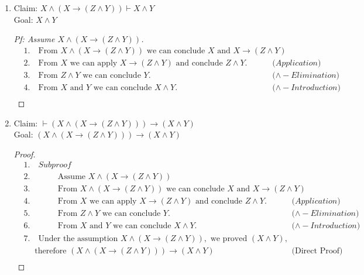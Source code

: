 \documentclass{article}
\begin{document}
\begin{enumerate}
\begin{enumerate}
        \item
        Claim: $X \land (X \rightarrow (Z \land Y)) \vdash X \land Y$ \\
        Goal: $X \land Y$
        \begin{proof}[Pf: Assume $X \land (X \rightarrow (Z \land Y))$]
            \begin{align*}
                &1. \quad \text{From } X \land (X \rightarrow (Z \land Y)) \text{ we can conclude } X \text{ and } X \rightarrow (Z \land Y) \\
                &2. \quad \text{From } X \text{ we can apply } X \rightarrow (Z \land Y) \text{ and conclude } Z \land Y. && \text{($Application$)} \\
                &3. \quad \text{From } Z \land Y \text{ we can conclude } Y. && \text{($\land - Elimination$)} \\
                &4. \quad \text{From } X \text{ and } Y \text{ we can conclude } X \land Y. && \text{($\land - Introduction$)} \\
            \end{align*}
        \end{proof}

        \item
        Claim: $\vdash (X \land (X \rightarrow (Z \land Y))) \rightarrow (X \land Y)$ \\
        Goal: $(X \land (X \rightarrow (Z \land Y))) \rightarrow (X \land Y)$
        \begin{proof}[Proof]
            \begin{align*}
                &1. \quad Subproof \\
                &2. \quad \hspace{1cm} \text{Assume } X \land (X \rightarrow (Z \land Y)) \\
                &3. \quad \hspace{1cm} \text{From } X \land (X \rightarrow (Z \land Y)) \text{ we can conclude } X \text{ and } X \rightarrow (Z \land Y) \\
                &4. \quad \hspace{1cm} \text{From } X \text{ we can apply } X \rightarrow (Z \land Y) \text{ and conclude } Z \land Y. && \text{($Application$)} \\
                &5. \quad \hspace{1cm} \text{From } Z \land Y \text{ we can conclude } Y. && \text{($\land - Elimination$)} \\
                &6. \quad \hspace{1cm} \text{From } X \text{ and } Y \text{ we can conclude } X \land Y. && \text{($\land - Introduction$)} \\
                &7. \quad \text{Under the assumption } X \land (X \rightarrow (Z \land Y)), \text{ we proved } (X \land Y), \\
                &\quad \text{ therefore } (X \land (X \rightarrow (Z \land Y))) \rightarrow (X \land Y) && \text{(Direct Proof)} \\
            \end{align*}
        \end{proof}


\end{enumerate}
\end{enumerate}
\end{document}
